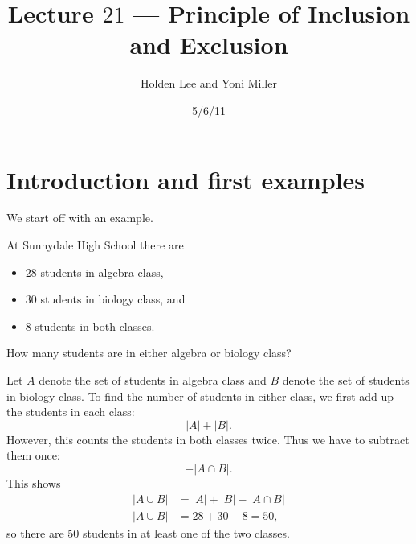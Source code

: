 
\pagestyle{fancy}





%
%

\title{Lecture $21$ --- Principle of Inclusion and Exclusion}%
\author{Holden Lee and Yoni Miller}
\date{5/6/11}%
\maketitle
\thispagestyle{empty}
\section{Introduction and first examples}
We start off with an example.
\begin{ex}
At Sunnydale High School there are
\begin{itemize}
\item $28$ students in algebra class,
\item $30$ students in biology class, and
\item $8$ students in both classes.
\end{itemize}
How many students are in either algebra or biology class?
\end{ex}
Let $A$ denote the set of students in algebra class and $B$ denote the set of students in biology class. To find the number of students in either class, we first add up the students in each class:
\[
|A|+|B|.
\]
However, this counts the students in both classes twice. Thus we have to subtract them once:
\[
-|A\cap B|.
\]
This shows
\begin{align*}
|A\cup B|&=|A|+|B|-|A\cap B|\\
|A\cup B|&=28+30-8=50,
\end{align*}
so there are 50 students in at least one of the two classes.\\

